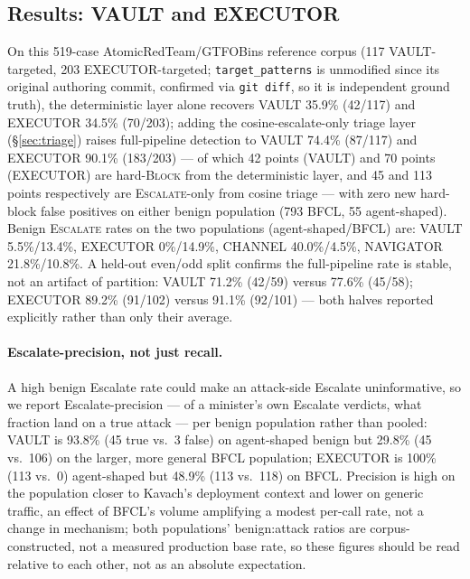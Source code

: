 \subsection{Results: VAULT and EXECUTOR}
\label{sec:vault-executor-eval}
On this 519-case AtomicRedTeam/GTFOBins reference corpus (117
VAULT-targeted, 203 EXECUTOR-targeted; \texttt{target\allowbreak\_patterns} is
unmodified since its original authoring commit, confirmed via
\texttt{git diff}, so it is independent ground truth), the deterministic
layer alone recovers VAULT 35.9\% (42/117) and EXECUTOR 34.5\% (70/203);
adding the cosine-escalate-only triage layer (\S\ref{sec:triage}) raises
full-pipeline detection to VAULT 74.4\% (87/117) and EXECUTOR 90.1\%
(183/203) --- of which 42 points (VAULT) and 70 points (EXECUTOR) are
hard-\textsc{Block} from the deterministic layer, and 45 and 113 points
respectively are \textsc{Escalate}-only from cosine triage --- with zero
new hard-block false positives on either benign population (793 BFCL, 55
agent-shaped). Benign \textsc{Escalate} rates on the two populations
(agent-shaped/BFCL) are: VAULT 5.5\%/13.4\%, EXECUTOR 0\%/14.9\%, CHANNEL
40.0\%/4.5\%, NAVIGATOR 21.8\%/10.8\%. A held-out even/odd split confirms
the full-pipeline rate is stable, not an artifact of partition: VAULT
71.2\% (42/59) versus 77.6\% (45/58); EXECUTOR 89.2\% (91/102) versus
91.1\% (92/101) --- both halves reported explicitly rather than only their
average.

\paragraph{Escalate-precision, not just recall.} A high benign Escalate
rate could make an attack-side Escalate uninformative, so we report
Escalate-precision --- of a minister's own Escalate verdicts, what
fraction land on a true attack --- per benign population rather than
pooled: VAULT is 93.8\% (45 true vs.\ 3 false) on agent-shaped benign but
29.8\% (45 vs.\ 106) on the larger, more general BFCL population; EXECUTOR
is 100\% (113 vs.\ 0) agent-shaped but 48.9\% (113 vs.\ 118) on BFCL.
Precision is high on the population closer to Kavach's deployment context
and lower on generic traffic, an effect of BFCL's volume amplifying a
modest per-call rate, not a change in mechanism; both
populations' benign:attack ratios are corpus-constructed, not a measured
production base rate, so these figures should be read relative to each
other, not as an absolute expectation.

